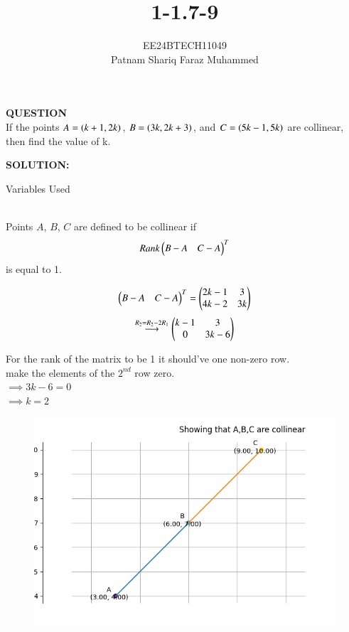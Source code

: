 \documentclass[journal]{IEEEtran}
\numberwithin{equation}{enumi}
\numberwithin{figure}{enumi}
\begin{document}


\title{1-1.7-9}
\author{EE24BTECH11049 \\ Patnam Shariq Faraz Muhammed}

{\let\newpage\relax\maketitle}

\textbf{QUESTION} \\
	If the points $A = \left(k + 1, 2k\right)$, $B = \left(3k, 2k + 3\right)$, and $C = \left(5k - 1, 5k\right)$ are collinear, then find the value of k.

\textbf{SOLUTION:} \\
\begin{table}[h!]    
  \centering
  
  \caption{Variables Used}
  \label{table: 1.7.9.1}
\end{table}\\
	
        Points $A$, $B$, $C$ are defined to be collinear if
        \begin{align*}
        Rank\begin{pmatrix}B - A & C - A\end{pmatrix}^{T}
        \end{align*}
        is equal to 1.

    
        \begin{center}
        \begin{align}
        \begin{pmatrix}B - A & C - A\end{pmatrix}^{T} = \begin{pmatrix}2k-1 & 3 \\ 4k-2 & 3k\end{pmatrix} 
        \end{align}
        \begin{align}
        \overset{R_2=R_2-2R_1}{\longrightarrow} \begin{pmatrix}k-1 & 3 \\ 0 & 3k-6\end{pmatrix}
        \end{align}
        
        For the rank of the matrix to be 1 it should've one non-zero row.\\ 
        make the elements of the $2^{nd}$ row zero.\\
        $\implies 3k-6 = 0$ \\
        $\implies k = 2$ \\
        \end{center}
        
        \begin{figure}[ht]
        \centering
        \includegraphics[width=0.7\linewidth]{figs/fig.png}
        \caption{}
        \label{graph}
    	\end{figure}
\end{document}
